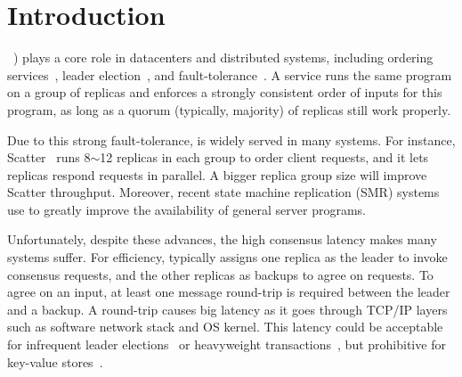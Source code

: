 \section{Introduction} \label{sec:intro}


\paxos~\cite{paxos:practical,paxos,paxos:simple,paxos:complex}) plays a core
role in datacenters and distributed systems, including ordering
services~\cite{ellis:thesis,manos:hotdep10,scatter:sosp11},
leader election~\cite{zookeeper, chubby:osdi}, and
fault-tolerance~\cite{eve:osdi12,rex:eurosys14,crane:sosp15}. A \paxos service
runs the same program on a group of replicas and enforces a strongly
consistent order of inputs for this program, as long as a quorum (typically,
majority) of replicas still work properly.

Due to this strong fault-tolerance, \paxos is widely served in many systems.
For instance, Scatter~\cite{scatter:sosp11} runs 8$\sim$12 replicas in each
\paxos group to order client requests, and it lets replicas respond requests
in parallel. A bigger replica group size will improve Scatter throughput.
Moreover, recent state machine replication (SMR) systems~\cite{ crane:sosp15,
eve:osdi12, rex:eurosys14} use \paxos to greatly improve the availability of
general server programs.






Unfortunately, despite these advances, the high \paxos consensus latency makes
many systems suffer. For efficiency, \paxos typically assigns one replica as
the leader to invoke consensus requests, and the other replicas as backups to
agree on requests. To agree on an input, at least one message round-trip is
required between the leader and a backup. A round-trip causes big latency as it
goes through TCP/IP layers such as software network stack and OS kernel. This
latency could be acceptable for infrequent
leader elections~\cite{chubby:osdi,zookeeper} or
heavyweight transactions~\cite{crane:sosp15,eve:osdi12}, but prohibitive for
key-value stores~\cite{redis,memcached}.

